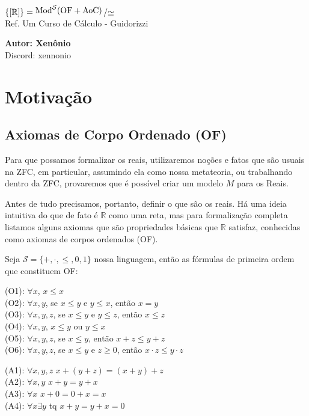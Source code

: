 \documentclass[11pt]{article}
\newcommand{\mc}[1]{\mathcal{#1}}
\newcommand{\mbb}[1]{\mathbb{#1}}
\newcommand{\bigslant}[2]{{\raisebox{.2em}{$#1$}\left/\raisebox{-.2em}{$#2$}\right.}}
\begin{document}
\thispagestyle{empty}

\begin{center}
{\LARGE \bf $\{[\mbb{R}]\}=\bigslant{\text{Mod}^\mc{S}(\text{OF}+\text{AoC})}{\cong}$}\\
{\large Ref. Um Curso de Cálculo - Guidorizzi}

\vspace{0.7cm}
\textbf{Autor: Xenônio}\\
Discord: xennonio
\end{center}

\tableofcontents

\section{Motivação}

\subsection{Axiomas de Corpo Ordenado (OF)}

Para que possamos formalizar os reais, utilizaremos noções e fatos que são usuais na ZFC, em particular, assumindo ela como nossa metateoria, ou trabalhando dentro da ZFC, provaremos que é possível criar um modelo $M$ para os Reais.

Antes de tudo precisamos, portanto, definir o que são os reais. Há uma ideia intuitiva do que de fato é $\mbb{R}$ como uma reta, mas para formalização completa listamos alguns axiomas que são propriedades básicas que $\mbb{R}$ satisfaz, conhecidas como axiomas de corpos ordenados (OF).

Seja $\mc{S}=\{+,\cdot,\leq,0,1\}$ nossa linguagem, então as fórmulas de primeira ordem que constituem OF:

(O1): $\forall x$, $x\leq x$\\
(O2): $\forall x,y$, se $x\leq y$ e $y\leq x$, então $x=y$\\
(O3): $\forall x,y,z$, se $x\leq y$ e $y\leq z$, então $x\leq z$\\
(O4): $\forall x,y$, $x\leq y$ ou $y\leq x$\\
(O5): $\forall x,y,z$, se $x\leq y$, então $x+z\leq y+z$\\
(O6): $\forall x,y,z$, se $x\leq y$ e $z\geq0$, então $x\cdot z\leq y\cdot z$

(A1): $\forall x,y,z$ $x+(y+z)=(x+y)+z$\\
(A2): $\forall x,y$ $x+y=y+x$\\
(A3): $\forall x$ $x+0=0+x=x$\\
(A4): $\forall x\exists y$ tq $x+y=y+x=0$
\end{document}
